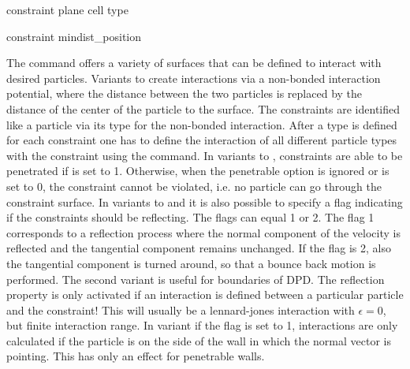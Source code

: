 \begin{essyntax}
  
  
  constraint plane cell    
  type 

  constraint mindist_position    

  \begin{features}
  \end{features}
\end{essyntax}

The  command offers a variety of surfaces that can be
defined to interact with desired particles. Variants  to 
create interactions via a non-bonded interaction potential, where the distance
between the two particles is replaced by the
distance of the center of the particle to the surface. The constraints are
identified like a particle via its type for the non-bonded interaction. 
After a type is defined for each constraint one has
to define
the interaction of all different particle types with the constraint using
the  command. In variants  to , constraints
 are able to be penetrated if  is set to 1. Otherwise, when the
 penetrable option is ignored or  is set to 0, the constraint
 cannot be violated, i.e. no particle can go through the constraint surface.
 In variants  to  and  it is also possible to specify a flag 
 indicating if the constraints should be reflecting. The flags can equal 1 or 2.
 The flag 1 corresponds to a reflection process where the normal component of the 
 velocity is reflected and the tangential component remains unchanged. If the
 flag is 2, also the tangential component is turned around, so that a bounce back
 motion is performed. The second variant is useful for boundaries of DPD.
 The reflection property is only activated if an interaction is defined between
 a particular particle and the constraint! This will usually be a lennard-jones
 interaction with $\epsilon=0$, but finite interaction range.
 In variant  if the  flag is set to 1, interactions are
 only calculated if the particle is on the side of the wall in which the normal
 vector is pointing. This has only an effect for penetrable walls.

